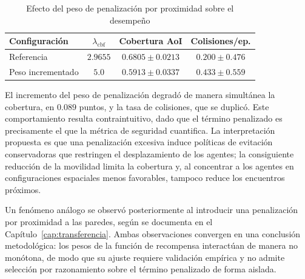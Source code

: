 \begin{table}[h]
    \centering\captionsetup{width=0.85\linewidth}
    \caption{Efecto del peso de penalización por proximidad sobre el
             desempeño}
    \begin{tabular}{lccc}
        \textbf{Configuración} & $\lambda_{\text{cbf}}$ &
        \textbf{Cobertura AoI} & \textbf{Colisiones/ep.} \\
        \hline
        Referencia & $2{.}9655$ & $0{.}6805 \pm 0{.}0213$
            & $0{.}200 \pm 0{.}476$ \\
        Peso incrementado & $5{.}0$ & $0{.}5913 \pm 0{.}0337$
            & $0{.}433 \pm 0{.}559$ \\
    \end{tabular}
    \label{tab:efecto_lambda_cbf}
\end{table}
 
 
El incremento del peso de penalización degradó de manera simultánea la
cobertura, en $0{.}089$ puntos, y la tasa de colisiones, que se duplicó. Este comportamiento resulta contraintuitivo,
dado que el término penalizado es precisamente el que la métrica de seguridad
cuantifica. La interpretación propuesta es que una penalización excesiva
induce políticas de evitación conservadoras que restringen el desplazamiento de
los agentes; la consiguiente reducción de la movilidad limita la cobertura y,
al concentrar a los agentes en configuraciones espaciales menos favorables,
tampoco reduce los encuentros próximos.
 
Un fenómeno análogo se observó posteriormente al introducir una penalización
por proximidad a las paredes, según se documenta en el Capítulo~\ref{cap:transferencia}. Ambas observaciones convergen en una conclusión metodológica:
los pesos de la función de recompensa interactúan de manera no monótona, de
modo que su ajuste requiere validación empírica y no admite selección por
razonamiento sobre el término penalizado de forma aislada.

